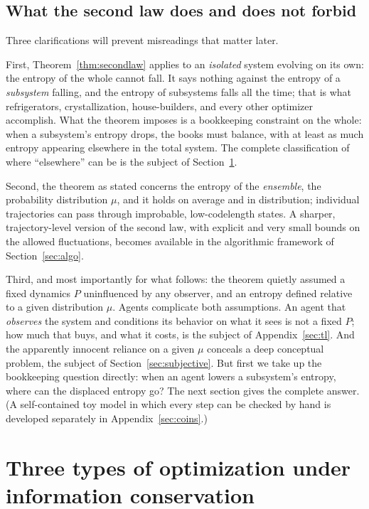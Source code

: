 \documentclass[10pt]{article}
\theoremstyle{definition}
\theoremstyle{remark}
\begin{document}
\subsection{What the second law does and does not forbid}
\label{sec:forbids}

Three clarifications will prevent misreadings that matter later.

First, Theorem~\ref{thm:secondlaw} applies to an \emph{isolated} system evolving on its own: the entropy of the whole cannot fall. It says nothing against the entropy of a \emph{subsystem} falling, and the entropy of subsystems falls all the time; that is what refrigerators, crystallization, house-builders, and every other optimizer accomplish. What the theorem imposes is a bookkeeping constraint on the whole: when a subsystem's entropy drops, the books must balance, with at least as much entropy appearing elsewhere in the total system. The complete classification of where ``elsewhere'' can be is the subject of Section~\ref{sec:threetypes}.

Second, the theorem as stated concerns the entropy of the \emph{ensemble}, the probability distribution $\mu$, and it holds on average and in distribution; individual trajectories can pass through improbable, low-codelength states. A sharper, trajectory-level version of the second law, with explicit and very small bounds on the allowed fluctuations, becomes available in the algorithmic framework of Section~\ref{sec:algo}.

Third, and most importantly for what follows: the theorem quietly assumed a fixed dynamics $P$ uninfluenced by any observer, and an entropy defined relative to a given distribution $\mu$. Agents complicate both assumptions. An agent that \emph{observes} the system and conditions its behavior on what it sees is not a fixed $P$; how much that buys, and what it costs, is the subject of Appendix~\ref{sec:tl}. And the apparently innocent reliance on a given $\mu$ conceals a deep conceptual problem, the subject of Section~\ref{sec:subjective}. But first we take up the bookkeeping question directly: when an agent lowers a subsystem's entropy, where can the displaced entropy go? The next section gives the complete answer. (A self-contained toy model in which every step can be checked by hand is developed separately in Appendix~\ref{sec:coins}.)

\section{Three types of optimization under information conservation}
\label{sec:threetypes}
\end{document}
